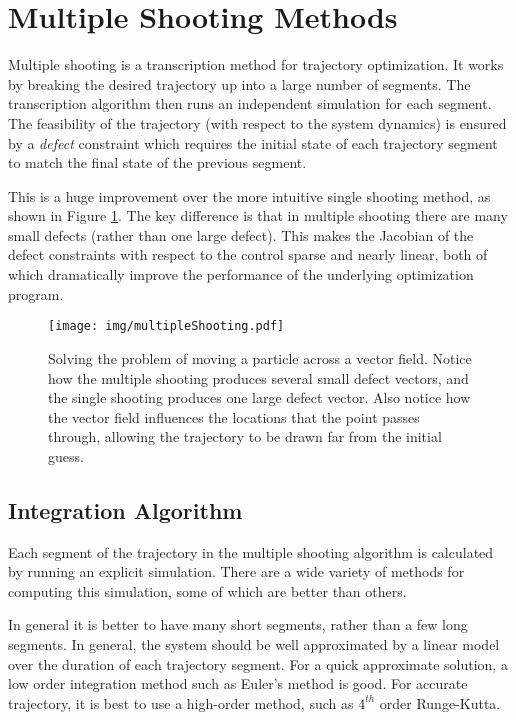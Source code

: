 \section{Multiple Shooting Methods}

Multiple shooting is a transcription method for trajectory optimization. It works by breaking the desired trajectory up into a large number of segments. The transcription algorithm then runs an independent simulation for each segment. The feasibility of the trajectory (with respect to the system dynamics) is ensured by a {\em defect} constraint which requires the initial state of each trajectory segment to match the final state of the previous segment. 

\par This is a huge improvement over the more intuitive single shooting method, as shown in Figure \ref{fig:multipleShooting}. The key difference is that in multiple shooting there are many small defects (rather than one large defect). This makes the Jacobian of the defect constraints with respect to the control sparse and nearly linear, both of which dramatically improve the performance of the underlying optimization program.


\begin{figure} 
    \centering 
    \texttt{[image: img/multipleShooting.pdf]}    
    \caption{Solving the problem of moving a particle across a vector field. Notice how the multiple shooting produces several small defect vectors, and the single shooting produces one large defect vector. Also notice how the vector field influences the locations that the point passes through, allowing the trajectory to be drawn far from the initial guess.}     
    \label{fig:multipleShooting}     
\end{figure} 


\subsection{Integration Algorithm} \label{sec:IntegrationAlgorithm}

Each segment of the trajectory in the multiple shooting algorithm is calculated by running an explicit simulation. There are a wide variety of methods for computing this simulation, some of which are better than others.

\par In general it is better to have many short segments, rather than a few long segments. In general, the system should be well approximated by a linear model over the duration of each trajectory segment. For a quick approximate solution, a low order integration method such as Euler's method is good. For accurate trajectory, it is best to use a high-order method, such as $4^{th}$ order Runge-Kutta.

